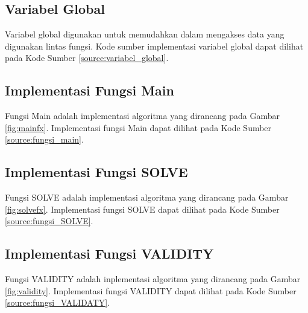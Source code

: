 \begin{minipage}{\linewidth}

\end{minipage}

\subsection{Variabel Global}
Variabel global digunakan untuk memudahkan dalam mengakses data yang digunakan lintas fungsi. Kode sumber implementasi variabel global dapat dilihat pada Kode Sumber \ref{source:variabel_global}.

\begin{minipage}{\linewidth}

\end{minipage} 

\subsection{Implementasi Fungsi Main}
Fungsi Main adalah implementasi algoritma yang dirancang pada Gambar \ref{fig:mainfx}. Implementasi fungsi Main dapat dilihat pada Kode Sumber \ref{source:fungsi_main}.



\subsection{Implementasi Fungsi SOLVE}
Fungsi SOLVE adalah implementasi algoritma yang dirancang pada Gambar \ref{fig:solvefx}. Implementasi fungsi SOLVE dapat dilihat pada Kode Sumber \ref{source:fungsi_SOLVE}. 

\begin{minipage}{\linewidth}

\end{minipage} 

\subsection{Implementasi Fungsi VALIDITY}
Fungsi VALIDITY adalah inplementasi algoritma yang dirancang pada Gambar \ref{fig:validity}. Implementasi fungsi VALIDITY dapat dilihat pada Kode Sumber \ref{source:fungsi_VALIDATY}.


